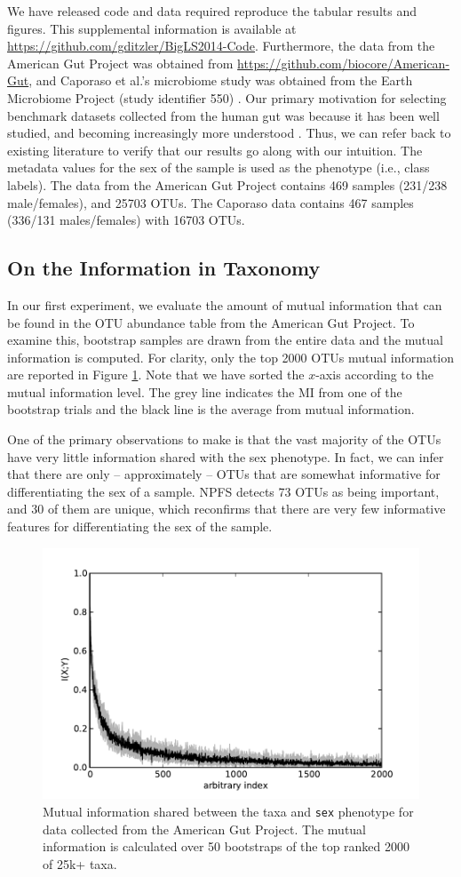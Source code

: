 \documentclass{acm_proc_article-sp}
\begin{document}
We have released code and data required reproduce the tabular results and figures. This supplemental information is available at \url{https://github.com/gditzler/BigLS2014-Code}. Furthermore, the data from the American Gut Project was obtained from \url{https://github.com/biocore/American-Gut}, and Caporaso et al.'s microbiome study was obtained from the Earth Microbiome Project (study identifier 550) \cite{Caporaso2011GB, Gilbert2010SGS}. Our primary motivation for selecting benchmark datasets collected from the human gut was because it has been well studied, and becoming increasingly more understood \cite{Caporaso2011GB, Arumugam2011Nat, Koenig2010NAS, Turnbaugh2009Nature, MetaHit, Yatsunenko2012Nature}. Thus, we can refer back to existing literature to verify that our results go along with our intuition. The  metadata values for the sex of the sample is used as the phenotype (i.e., class labels). The data from the American Gut Project contains 469 samples (231/238 male/females), and 25703 OTUs. The Caporaso data contains 467 samples (336/131 males/females) with 16703 OTUs.


\subsection{On the Information in Taxonomy}
In our first experiment, we evaluate the amount of mutual information that can be found in the OTU abundance table from the American Gut Project. To examine this, bootstrap samples are drawn from the entire data and the mutual information is computed. For clarity, only the top 2000 OTUs mutual information are reported in Figure \ref{fig:mi boots}. Note that we have sorted the $x$-axis according to the mutual information level. The grey line indicates the MI from one of the bootstrap trials and the black line is the average from mutual information.  

One of the primary observations to make is that the vast majority of the OTUs have very little information shared with the sex phenotype. In fact, we can infer that there are only -- approximately -- OTUs that are somewhat informative for differentiating the sex of a sample. NPFS detects 73 OTUs as being important, and 30 of them are unique, which reconfirms that there are very few informative features for differentiating the sex of the sample. 


\begin{figure}
  \centering
  \includegraphics[width=.45\textwidth]{ag-mf-mi-bootstraps.pdf}
  \caption{Mutual information shared between the taxa and \texttt{sex} phenotype for data collected from the American Gut Project. The mutual information is calculated over 50 bootstraps of the top ranked 2000 of 25k+ taxa. }
  \label{fig:mi boots}
\end{figure}
\end{document}
